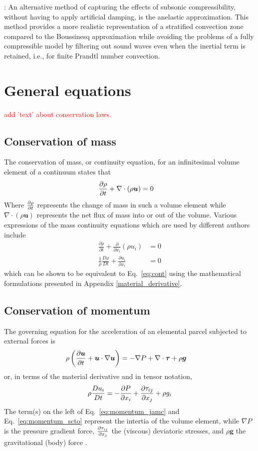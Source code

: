 \documentclass[a4paper]{article}
\newcommand{\mdv}[2]{\frac{D #1}{D #2}}
\begin{document}
\cite{glat88}: An alternative method of capturing the effects of subsonic compressibility,
without having to apply artificial damping, is the anelastic
approximation. This method provides a more realistic
representation of a stratified convection zone compared to the
Boussinesq approximation while avoiding the problems of a fully
compressible model by filtering out sound waves even when the
inertial term is retained, i.e., for finite Prandtl number convection.
\section{General equations} \label{section:general_eq}

\textcolor{red}{add 'text' about conservation laws.}

\subsection{Conservation of mass}
The conservation of mass, or continuity equation, for an infinitesimal volume element of a continuum states that
\begin{align}
    \pdv{\rho}{t} + \nabla \cdot (\rho\bm{u}) &= 0 \label{eq:cont}
\end{align}
Where $\pdv{\rho}{t}$ represents the change of mass in such a volume element while $\nabla \cdot (\rho\bm{u})$ represents the net flux
of mass into or out of the volume. Various expressions of the mass continuity equations which are used by different authors include 
\begin{align*}
    \frac{\partial \rho}{\partial t} + \frac{\partial}{\partial x_i}(\rho u_i) &= 0\\
\frac{1}{\rho}\frac{D\rho}{Dt} + \frac{\partial u_i}{\partial x_i} &= 0
\end{align*}
which can be shown to be equivalent to Eq.~\eqref{eq:cont} using the mathematical formulations presented in Appendix \ref{material_derivative}.

\subsection{Conservation of momentum}
The governing equation for the acceleration of an elemental parcel subjected to external forces is 
\begin{align} \label{eq:momentum_jamc}
    \rho\left(\pdv{\bm{u}}{t} + \bm{u} \cdot \nabla \bm{u}\right) &= -\nabla P + \nabla\cdot {\bm \tau} + \rho \bm{g} 
\end{align}
or, in terms of the material derivative and in tensor notation,
\begin{align} \label{eq:momentum_scto} 
    \rho \mdv{u_i}{t} = - \pdv{P}{x_i} + \pdv{\tau_{ij}}{x_j}+\rho g_i
\end{align}
The term(s) on the left of Eq.~\eqref{eq:momentum_jamc} and Eq.~\eqref{eq:momentum_scto} represent the intertia of the 
volume element, while $\nabla P$ is the pressure gradient force, 
$\pdv{\tau_{ij}}{x_j}$ the (viscous) deviatoric stresses, and $\rho \bm{g}$ the gravitational (body) force \autocite{scto01}. 
\end{document}
